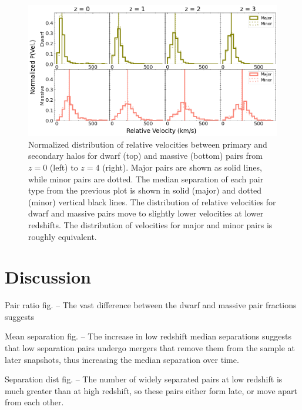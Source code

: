 \documentclass[twocolumn]{aastex631}
\begin{document}
\begin{figure}[htb]
  \centering
  \includegraphics[width=\textwidth]{velocity_distribution.png}
  \caption{
  Normalized distribution of relative velocities between primary and secondary halos for dwarf (top) and massive (bottom) pairs from $z=0$ (left) to $z=4$ (right). Major pairs are shown as solid lines, while minor pairs are dotted. The median separation of each pair type from the previous plot is shown in solid (major) and dotted (minor) vertical black lines. 
  The distribution of relative velocities for dwarf and massive pairs move to slightly lower velocities at lower redshifts. The distribution of velocities for major and minor pairs is roughly equivalent. 
    }
  \label{fig:vel-dist}
\end{figure}




\section{Discussion}
\label{sec:discussion}

Pair ratio fig. -- The vast difference between the dwarf and massive pair fractions suggests  

Mean separation fig. -- The increase in low redshift median separations suggests that low separation pairs undergo mergers that remove them from the sample at later snapshots, thus increasing the median separation over time.

Separation dist fig. -- The number of widely separated pairs at low redshift is much greater than at high redshift, so these pairs either form late, or move apart from each other. 
\end{document}
